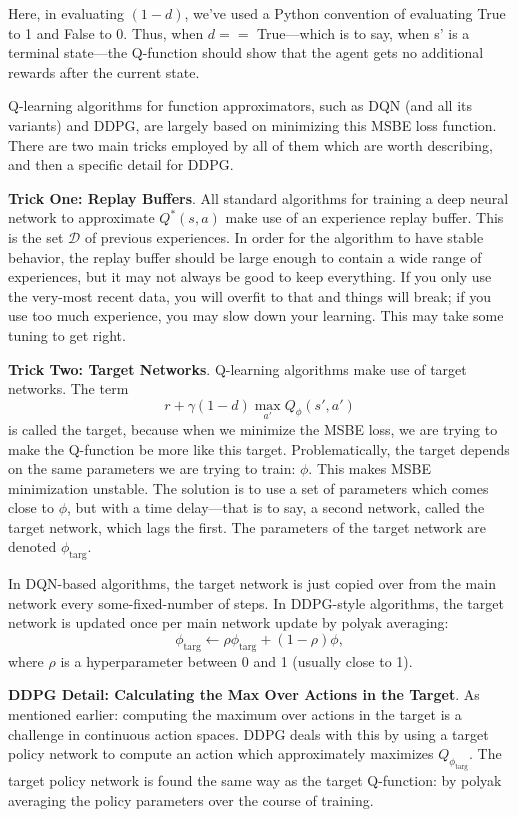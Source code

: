 Here, in evaluating $(1-d)$, we've used a Python convention of evaluating True to 1 and False to 0. Thus, when $d ==$ True---which is to say, when s' is a terminal state---the Q-function should show that the agent gets no additional rewards after the current state.

Q-learning algorithms for function approximators, such as DQN (and all its variants) and DDPG, are largely based on minimizing this MSBE loss function. There are two main tricks employed by all of them which are worth describing, and then a specific detail for DDPG.

\textbf{Trick One: Replay Buffers}. All standard algorithms for training a deep neural network to approximate $Q^*(s,a)$ make use of an experience replay buffer. This is the set ${\mathcal D}$ of previous experiences. In order for the algorithm to have stable behavior, the replay buffer should be large enough to contain a wide range of experiences, but it may not always be good to keep everything. If you only use the very-most recent data, you will overfit to that and things will break; if you use too much experience, you may slow down your learning. This may take some tuning to get right.

\textbf{Trick Two: Target Networks}. Q-learning algorithms make use of target networks. The term
\begin{equation}
r + \gamma (1 - d) \max_{a'} Q_{\phi}(s',a')
\end{equation}
is called the target, because when we minimize the MSBE loss, we are trying to make the Q-function be more like this target. Problematically, the target depends on the same parameters we are trying to train: $\phi$. This makes MSBE minimization unstable. The solution is to use a set of parameters which comes close to $\phi$, but with a time delay---that is to say, a second network, called the target network, which lags the first. The parameters of the target network are denoted $\phi_{\text{targ}}$.

In DQN-based algorithms, the target network is just copied over from the main network every some-fixed-number of steps. In DDPG-style algorithms, the target network is updated once per main network update by polyak averaging:
\begin{equation}
\phi_{\text{targ}} \leftarrow \rho \phi_{\text{targ}} + (1 - \rho) \phi,
\end{equation}
where $\rho$ is a hyperparameter between 0 and 1 (usually close to 1).

\textbf{DDPG Detail: Calculating the Max Over Actions in the Target}. As mentioned earlier: computing the maximum over actions in the target is a challenge in continuous action spaces. DDPG deals with this by using a target policy network to compute an action which approximately maximizes $Q_{\phi_{\text{targ}}}$. The target policy network is found the same way as the target Q-function: by polyak averaging the policy parameters over the course of training.

